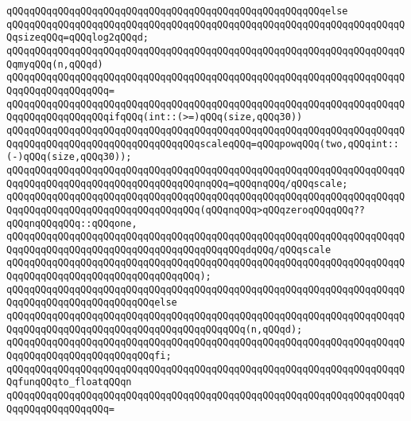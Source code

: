 \verb|qQQqqQQqqQQqqQQqqQQqqQQqqQQqqQQqqQQqqQQqqQQqqQQqqQQqqQQqelse|\newline
\verb|qQQqqQQqqQQqqQQqqQQqqQQqqQQqqQQqqQQqqQQqqQQqqQQqqQQqqQQqqQQqqQQqqQQqqQQqsizeqQQq=qQQqlog2qQQqd;|\newline
\newline
\verb|qQQqqQQqqQQqqQQqqQQqqQQqqQQqqQQqqQQqqQQqqQQqqQQqqQQqqQQqqQQqqQQqqQQqqQQqmyqQQq(n,qQQqd)|\newline
\verb|qQQqqQQqqQQqqQQqqQQqqQQqqQQqqQQqqQQqqQQqqQQqqQQqqQQqqQQqqQQqqQQqqQQqqQQqqQQqqQQqqQQqqQQq=|\newline
\verb|qQQqqQQqqQQqqQQqqQQqqQQqqQQqqQQqqQQqqQQqqQQqqQQqqQQqqQQqqQQqqQQqqQQqqQQqqQQqqQQqqQQqqQQqifqQQq(int::(>=)qQQq(size,qQQq30))|\newline
\newline
\verb|qQQqqQQqqQQqqQQqqQQqqQQqqQQqqQQqqQQqqQQqqQQqqQQqqQQqqQQqqQQqqQQqqQQqqQQqqQQqqQQqqQQqqQQqqQQqqQQqqQQqqQQqscaleqQQq=qQQqpowqQQq(two,qQQqint::(-)qQQq(size,qQQq30));|\newline
\verb|qQQqqQQqqQQqqQQqqQQqqQQqqQQqqQQqqQQqqQQqqQQqqQQqqQQqqQQqqQQqqQQqqQQqqQQqqQQqqQQqqQQqqQQqqQQqqQQqqQQqqQQqnqQQq=qQQqnqQQq/qQQqscale;|\newline
\newline
\verb|qQQqqQQqqQQqqQQqqQQqqQQqqQQqqQQqqQQqqQQqqQQqqQQqqQQqqQQqqQQqqQQqqQQqqQQqqQQqqQQqqQQqqQQqqQQqqQQqqQQqqQQq(qQQqnqQQq>qQQqzeroqQQqqQQq??qQQqnqQQqqQQq::qQQqone,|\newline
\verb|qQQqqQQqqQQqqQQqqQQqqQQqqQQqqQQqqQQqqQQqqQQqqQQqqQQqqQQqqQQqqQQqqQQqqQQqqQQqqQQqqQQqqQQqqQQqqQQqqQQqqQQqqQQqqQQqdqQQq/qQQqscale|\newline
\verb|qQQqqQQqqQQqqQQqqQQqqQQqqQQqqQQqqQQqqQQqqQQqqQQqqQQqqQQqqQQqqQQqqQQqqQQqqQQqqQQqqQQqqQQqqQQqqQQqqQQqqQQq);|\newline
\newline
\verb|qQQqqQQqqQQqqQQqqQQqqQQqqQQqqQQqqQQqqQQqqQQqqQQqqQQqqQQqqQQqqQQqqQQqqQQqqQQqqQQqqQQqqQQqqQQqqQQqelse|\newline
\verb|qQQqqQQqqQQqqQQqqQQqqQQqqQQqqQQqqQQqqQQqqQQqqQQqqQQqqQQqqQQqqQQqqQQqqQQqqQQqqQQqqQQqqQQqqQQqqQQqqQQqqQQqqQQqqQQq(n,qQQqd);|\newline
\verb|qQQqqQQqqQQqqQQqqQQqqQQqqQQqqQQqqQQqqQQqqQQqqQQqqQQqqQQqqQQqqQQqqQQqqQQqqQQqqQQqqQQqqQQqqQQqqQQqfi;|\newline
\newline
\verb|qQQqqQQqqQQqqQQqqQQqqQQqqQQqqQQqqQQqqQQqqQQqqQQqqQQqqQQqqQQqqQQqqQQqqQQqfunqQQqto_floatqQQqn|\newline
\verb|qQQqqQQqqQQqqQQqqQQqqQQqqQQqqQQqqQQqqQQqqQQqqQQqqQQqqQQqqQQqqQQqqQQqqQQqqQQqqQQqqQQqqQQq=|\newline
